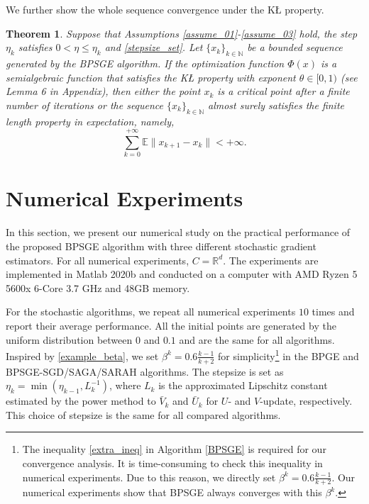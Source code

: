 \documentclass[letterpaper]{article} %
\newtheorem{theorem}{Theorem}
\begin{document}
	We further show the whole sequence convergence under the K{\L} property. 
	\begin{theorem}\label{global_convergence}
		Suppose that Assumptions \ref{assume_01}-\ref{assume_03} hold, the step $\eta_{k}$ satisfies $0<\eta\le \eta_{k}$ and \eqref{stepsize_set}. Let $\{x_{k}\}_{k\in\mathbb{N}}$ be a bounded sequence generated by the BPSGE algorithm. If the optimization function $\Phi(x)$ is a semialgebraic function that satisﬁes the K{\L} property with exponent $\theta \in [0, 1)$ (see Lemma 6 in Appendix), then either the point $x_{k}$ is a critical point after a ﬁnite number of iterations or the sequence $\{ x_{k}\}_{k \in\mathbb{N}}$ almost surely satisﬁes the ﬁnite length property in expectation, namely,
		\[
		\sum_{k=0}^{+\infty}\mathbb{E}\|x_{k+1}-x_{k}\|<+\infty.
		\]
	\end{theorem}
	
	
	
	\section{Numerical Experiments}\label{numercial_experiments}
	In this section, we present our numerical study on the practical performance of the proposed BPSGE algorithm with three diﬀerent stochastic gradient estimators.  For all numerical experiments,  $C=\mathbb{R}^{d}$.  The experiments are implemented in Matlab 2020b and conducted on a computer with AMD Ryzen 5 5600x 6-Core 3.7 GHz and 48GB memory.
	
	For the stochastic algorithms, we repeat all numerical experiments $10$ times and report their average performance. All  the initial points are generated by the uniform distribution between $0$ and $0.1$ and are the same for all algorithms. Inspired by \eqref{example_beta}, we set $\beta^{k}=0.6\frac{k-1}{k+2}$  for simplicity\footnote{The inequality \eqref{extra_ineq} in Algorithm \ref{BPSGE} is required for our convergence analysis. It is time-consuming to check this inequality in numerical experiments. Due to this reason, we directly set $\beta^{k}=0.6\frac{k-1}{k+2}$. Our numerical experiments show that BPSGE always converges with this $\beta^k$.} in the BPGE and BPSGE-SGD/SAGA/SARAH algorithms. The stepsize is set as $\eta_{k}=\min(\eta_{k-1}, L_{k}^{-1})$, where $L_{k}$ is the approximated Lipschitz constant 
	estimated by the power method to $\bar{V}_{k}$ and $\bar{U}_{k}$ for $U$- and $V$-update,  respectively. 
	This choice of stepsize is  the  same  for all  compared algorithms. 
	
\end{document}
